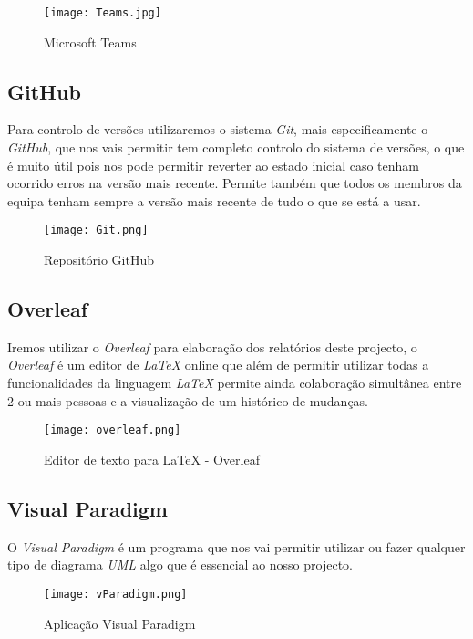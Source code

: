\documentclass[a4paper]{article}
\begin{document}
\begin{figure}[H]
    \centering
    \texttt{[image: Teams.jpg]}
    \caption{Microsoft Teams\texttrademark}
    \label{fig:teams}
\end{figure}

\subsection{GitHub}
Para controlo de versões utilizaremos o sistema \textit{Git}, mais especificamente o \textit{GitHub}, que nos vais permitir tem completo controlo do sistema de versões, o que é muito útil pois nos pode permitir reverter ao estado inicial caso tenham ocorrido erros na versão mais recente.
Permite também que todos os membros da equipa tenham sempre a versão mais recente de tudo o que se está a usar.

\begin{figure}[H]
    \centering
    \texttt{[image: Git.png]}
    \caption{Repositório GitHub\texttrademark}
    \label{fig:github}
\end{figure}

\subsection{Overleaf}
Iremos utilizar o \textit{Overleaf} para elaboração dos relatórios deste projecto, o \textit{Overleaf} é um editor de \textit{LaTeX} online que além de permitir utilizar todas a funcionalidades da linguagem \textit{LaTeX} permite ainda colaboração simultânea entre 2 ou mais pessoas e a visualização de um histórico de mudanças.

\begin{figure}[H]
    \centering
    \texttt{[image: overleaf.png]}
    \caption{Editor de texto para LaTeX - Overleaf\texttrademark }
    \label{fig:overleaf}
\end{figure}

\subsection{Visual Paradigm}
O \textit{Visual Paradigm} é um programa que nos vai permitir utilizar ou fazer qualquer tipo de diagrama \textit{UML} algo que é essencial ao nosso projecto. 

\begin{figure}[H]
    \centering
    \texttt{[image: vParadigm.png]}
    \caption{Aplicação Visual Paradigm\texttrademark}
    \label{fig:VP}
\end{figure}
\end{document}

